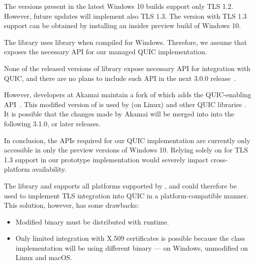 \begin{description}

     The \libschannel{} versions present in the latest Windows 10
    builds support only TLS 1.2.  However, future updates will implement also TLS 1.3. The
    \libschannel{} version with TLS 1.3 support can be obtained by installing an insider preview
    build of Windows 10.

    The \libmsquic{} library uses \libschannel{} library when compiled for Windows. Therefore, we
    assume that \libschannel{} exposes the necessary API for our managed QUIC implementation.

    \ditem{\libopenssl{}}
    None of the released versions of \libopenssl{} library expose necessary API for integration
    with QUIC, and there are no plans to include such API in the next \libopenssl{} 3.0.0
    release~\cite{OpensslBlogNoQuic}.

    However, developers at Akamai maintain a fork of \libopenssl{} which adds the QUIC-enabling
    API~\cite{AkamaiOpensslGithub}. This modified version of \libopenssl{} is used by \libmsquic{}
    (on Linux) and other QUIC libraries . It is possible
    that the changes made by Akamai will be merged into \libopenssl{} into the following 3.1.0, or
    later releases.

\end{description}

In conclusion, the APIs required for our QUIC implementation are currently only accessible in only
the preview versions of Windows 10. Relying solely on \libschannel{} for TLS 1.3 support in our
prototype implementation would severely impact cross-platform availability.

The \libopenssl{} library and supports all platforms supported by \dotnet{}, and could therefore be
used to implement TLS integration into QUIC in a platform-compatible manner. This solution, however,
has some drawbacks:


\begin{itemize}

  \item Modified \libopenssl{} binary must be distributed with \dotnet{} runtime.

  \item Only limited integration with X.509 certificates is possible because the
     class implementation will be using different binary ---
     on Windows, unmodified \libopenssl{} on Linux and macOS.

\end{itemize}

